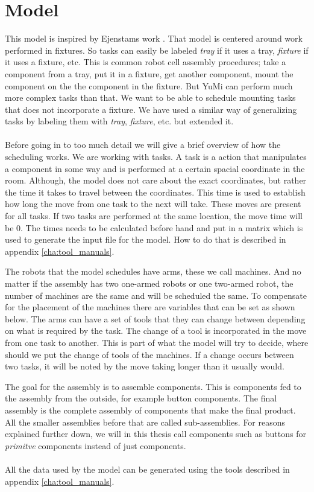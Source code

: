 \chapter{Model}\label{cha:model}

 This model is inspired by Ejenstams work \cite{ejenstam_2014}. That model is centered around work performed in fixtures. So tasks can easily be labeled \emph{tray} if it uses a tray, \emph{fixture} if it uses a fixture, etc. This is common robot cell assembly procedures; take a component from a tray, put it in a fixture, get another component, mount the component on the the component in the fixture. But YuMi can perform much more complex tasks than that. We want to be able to schedule mounting tasks that does not incorporate a fixture. We have used a similar way of generalizing tasks by labeling them with \emph{tray}, \emph{fixture}, etc. but extended it.
 \\\\
Before going in to too much detail we will give a brief overview of how the scheduling works. We are working with tasks. A task is a action that manipulates a component in some way and is performed at a certain spacial coordinate in the room. Although, the model does not care about the exact coordinates, but rather the time it takes to travel between the coordinates. This time is used to establish how long the move from one task to the next will take. These moves are present for all tasks. If two tasks are performed at the same location, the move time will be $0$. The times needs to be calculated before hand and put in a matrix which is used to generate the input file for the model. How to do that is described in appendix \ref{cha:tool_manuals}.

The robots that the model schedules have arms, these we call machines. And no matter if the assembly has two one-armed robots or one two-armed robot, the number of machines are the same and will be scheduled the same. To compensate for the placement of the machines there are variables that can be set as shown below. The arms can have a set of tools that they can change between depending on what is required by the task. The change of a tool is incorporated in the move from one task to another. This is part of what the model will try to decide, where should we put the change of tools of the machines. If a change occurs between two tasks, it will be noted by the move taking longer than it usually would.

 The goal for the assembly is to assemble components. This is components fed to the assembly from the outside, for example button components. The final assembly is the complete assembly of components that make the final product. All the smaller assemblies before that are called sub-assemblies. For reasons explained further down, we will in this thesis call components such as buttons for \emph{primitve} components instead of just components.
\\\\
 All the data used by the model can be generated using the tools described in appendix \ref{cha:tool_manuals}.
 
